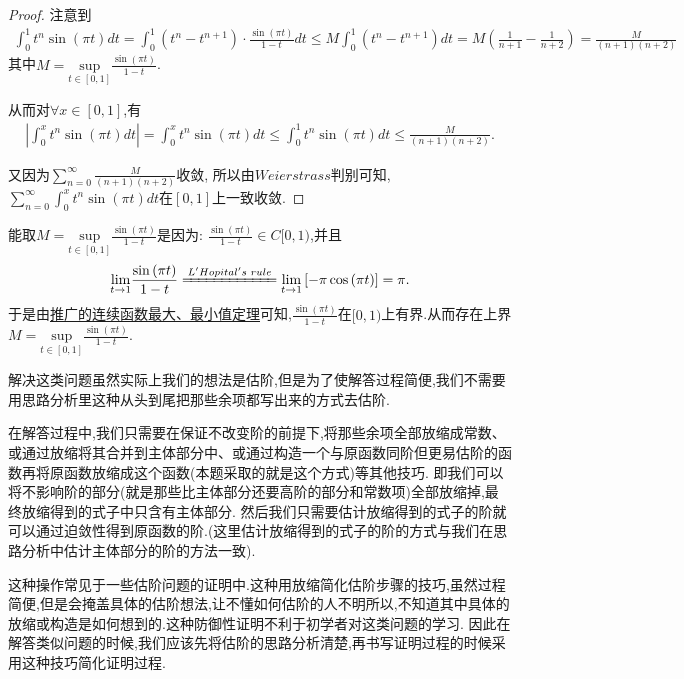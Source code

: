 \documentclass[lang=cn,newtx,10pt,scheme=chinese]{elegantbook}
\begin{document}
\begin{proof}
  {\color{blue}}
  注意到\begin{align*}
    \int_0^1{t^n\sin \left( \pi t \right) dt}=\int_0^1{ \left( t^n-t^{n+1} \right) \cdot \frac{\sin \left( \pi t \right)}{1-t}  dt}\leqslant M\int_0^1{\left( t^n-t^{n+1} \right)}dt=M\left( \frac{1}{n+1}-\frac{1}{n+2} \right) =\frac{M}{\left( n+1 \right) \left( n+2 \right)}
  \end{align*}
  其中$M=\underset{t\in \left[ 0,1 \right]}{\mathrm{sup}}\frac{\sin \left( \pi t \right)}{1-t}$.

  从而对$\forall x\in[0,1]$,有\begin{align*}
    \left| \int_0^x{t^n\sin \left( \pi t \right) dt} \right|=\int_0^x{t^n\sin \left( \pi t \right) dt}\leqslant \int_0^1{t^n\sin \left( \pi t \right) dt}\leqslant \frac{M}{\left( n+1 \right) \left( n+2 \right)}.
  \end{align*}



  又因为$\sum_{n=0}^{\infty}{\frac{M}{\left( n+1 \right) \left( n+2 \right)}}$收敛,
  所以由$Weierstrass$判别可知,$\sum_{n=0}^{\infty}{\int_0^x{t^n\sin \left( \pi t \right) dt}}$在$\left[ 0,1 \right] $上一致收敛.
\end{proof}
\begin{remark}
  能取$M=\underset{t\in \left[ 0,1 \right]}{\mathrm{sup}}\frac{\sin \left( \pi t \right)}{1-t}$是因为:
  $\frac{\sin \left( \pi t \right)}{1-t}\in C[0,1)$,并且
  \begin{align*}
  \underset{t\rightarrow 1}{\lim}\frac{\sin \left( \pi t \right)}{1-t}\xlongequal{L'Hopital's\,\,rule}\underset{t\rightarrow 1}{\lim}\left[ -\pi \cos \left( \pi t \right) \right] =\pi .
  \end{align*}
  于是由\hyperlink{label}{推广的连续函数最大、最小值定理}可知,$\frac{\sin \left( \pi t \right)}{1-t}$在$[0,1)$上有界.从而存在上界$M=\underset{t\in \left[ 0,1 \right]}{\mathrm{sup}}\frac{\sin \left( \pi t \right)}{1-t}$.
\end{remark}
\begin{remark}
  解决这类问题虽然实际上我们的想法是估阶,但是为了使解答过程简便,我们不需要用思路分析里这种从头到尾把那些余项都写出来的方式去估阶.

在解答过程中,我们只需要在保证不改变阶的前提下,将那些余项全部放缩成常数、或通过放缩将其合并到主体部分中、或通过构造一个与原函数同阶但更易估阶的函数再将原函数放缩成这个函数(本题采取的就是这个方式)等其他技巧.
即我们可以将不影响阶的部分(就是那些比主体部分还要高阶的部分和常数项)全部放缩掉,最终放缩得到的式子中只含有主体部分.
然后我们只需要估计放缩得到的式子的阶就可以通过迫敛性得到原函数的阶.(这里估计放缩得到的式子的阶的方式与我们在思路分析中估计主体部分的阶的方法一致).

这种操作常见于一些估阶问题的证明中.这种用放缩简化估阶步骤的技巧,虽然过程简便,但是会掩盖具体的估阶想法,让不懂如何估阶的人不明所以,不知道其中具体的放缩或构造是如何想到的.这种防御性证明不利于初学者对这类问题的学习.
因此在解答类似问题的时候,我们应该先将估阶的思路分析清楚,再书写证明过程的时候采用这种技巧简化证明过程.
\end{remark}
\end{document}

